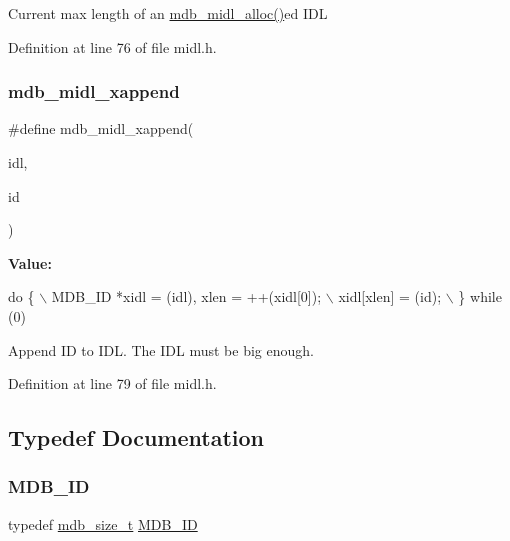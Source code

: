Current max length of an \mbox{\hyperlink{group__idls_gab239e78f44ae65ce84c1a63c99f14b19}{mdb\+\_\+midl\+\_\+alloc()}}ed I\+DL 

Definition at line 76 of file midl.\+h.

\mbox{\label{group__idls_gaf1e1ecbabeea10bcf19bd7ab616dcbc1}} 
\subsubsection{\texorpdfstring{mdb\+\_\+midl\+\_\+xappend}{mdb\_midl\_xappend}}
{\footnotesize\ttfamily \#define mdb\+\_\+midl\+\_\+xappend(\begin{DoxyParamCaption}\item[{}]{idl,  }\item[{}]{id }\end{DoxyParamCaption})}

{\bfseries Value\+:}
\begin{DoxyCode}
\textcolor{keywordflow}{do} \{ \(\backslash\)
        MDB\_ID *xidl = (idl), xlen = ++(xidl[0]); \(\backslash\)
        xidl[xlen] = (id); \(\backslash\)
    \} \textcolor{keywordflow}{while} (0)
\end{DoxyCode}
Append ID to I\+DL. The I\+DL must be big enough. 

Definition at line 79 of file midl.\+h.



\subsection{Typedef Documentation}
\mbox{\label{group__idls_ga792192229a977c49f083846b5635f92d}} 
\subsubsection{\texorpdfstring{M\+D\+B\+\_\+\+ID}{MDB\_ID}}
{\footnotesize\ttfamily typedef \mbox{\hyperlink{lmdb_8h_a78821971e612e3898ef4b3ae45ed86f1}{mdb\+\_\+size\+\_\+t}} \mbox{\hyperlink{group__idls_ga792192229a977c49f083846b5635f92d}{M\+D\+B\+\_\+\+ID}}}

